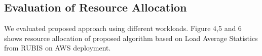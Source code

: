 \subsection{Evaluation of Resource Allocation}
We evaluated proposed approach using different workloads. Figure 4,5 and 6 shows resource allocation of proposed algorithm based on Load Average Statistics from RUBIS on AWS deployment.
